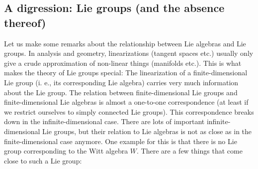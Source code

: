\documentclass[etingof-lie.tex]{subfiles}
\begin{document}
\subsection{\label{subsect.Wreal}A digression: Lie groups (and the absence
thereof)}

Let us make some remarks about the relationship between Lie algebras and Lie
groups. In analysis and geometry, linearizations (tangent spaces etc.) usually
only give a crude approximation of non-linear things (manifolds etc.). This is
what makes the theory of Lie groups special: The linearization of a
finite-dimensional Lie group (i. e., its corresponding Lie algebra) carries
very much information about the Lie group. The relation between
finite-dimensional Lie groups and finite-dimensional Lie algebras is almost a
one-to-one correspondence (at least if we restrict ourselves to simply
connected Lie groups). This correspondence breaks down in the
infinite-dimensional case. There are lots of important infinite-dimensional
Lie groups, but their relation to Lie algebras is not as close as in the
finite-dimensional case anymore. One example for this is that there is no Lie
group corresponding to the Witt algebra $W$. There are a few things that come
close to such a Lie group:
\end{document}
